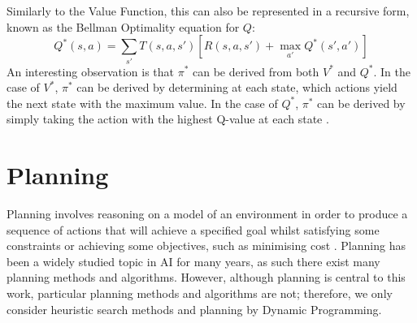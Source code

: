 Similarly to the Value Function, this can also be represented in a recursive form, known as the Bellman Optimality equation for $Q$:
\begin{equation}
\label{eqn:qsB}
Q^*(s,a) = \sum_{s'}T(s,a,s')[R(s,a,s')+\max_{a'}Q^*(s',a')]
\end{equation}
An interesting observation is that $\pi^*$ can be derived from both $V^*$ and $Q^*$. In the case of $V^*$, $\pi^*$ can be derived by determining at each state, which actions yield the next state with the maximum value. In the case of $Q^*$, $\pi^*$ can be derived by simply taking the action with the highest Q-value at each state \cite{Sutton1998}.


\section{Planning}
Planning involves reasoning on a model of an environment in order to produce a sequence of actions that will achieve a specified goal whilst satisfying some constraints or achieving some objectives, such as minimising cost \cite{DBLP:books/aw/RN2020, Lav06, GhallabNauTraverso04}. 
Planning has been a widely studied topic in AI for many years, as such there exist many planning methods and algorithms. However, although planning is central to this work, particular planning methods and algorithms are not; therefore, we only consider heuristic search methods and planning by Dynamic Programming.

